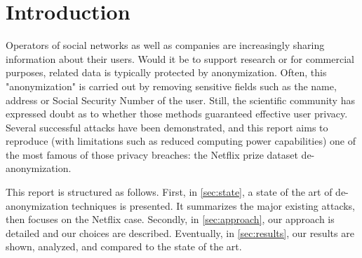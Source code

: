 \section{Introduction}

Operators of social networks as well as companies are increasingly sharing information about their users. Would it be to support research or for commercial purposes, related data is typically protected by anonymization. Often, this "anonymization" is carried out by removing sensitive fields such as the name, address or Social Security Number of the user. Still, the scientific community has expressed doubt as to whether those methods guaranteed effective user privacy. Several successful attacks have been demonstrated, and this report aims to reproduce (with limitations such as reduced computing power capabilities) one of the most famous of those privacy breaches: the Netflix prize dataset de-anonymization.

This report is structured as follows. First, in \autoref{sec:state}, a state of the art of de-anonymization techniques is presented. It summarizes the major existing attacks, then focuses on the Netflix case. Secondly, in \autoref{sec:approach}, our approach is detailed and our choices are described. Eventually, in \autoref{sec:results}, our results are shown, analyzed, and compared to the state of the art. 
